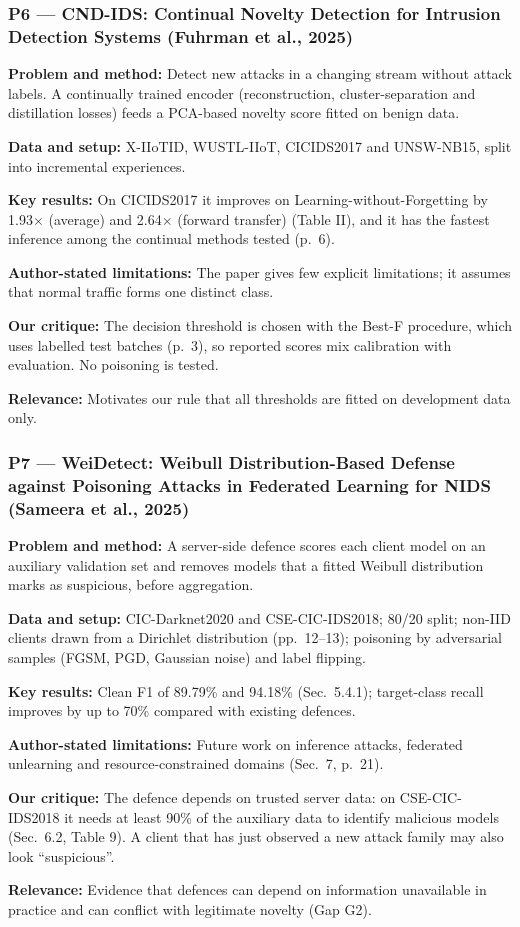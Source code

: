 \documentclass[10pt,a4paper]{article}
\newcommand{\sumitem}[2]{\noindent\textbf{#1:} #2\par}
\begin{document}
\subsubsection*{P6 --- CND-IDS: Continual Novelty Detection for Intrusion Detection Systems (Fuhrman et al., 2025)}
\sumitem{Problem and method}{Detect new attacks in a changing stream without attack labels. A continually trained encoder (reconstruction, cluster-separation and distillation losses) feeds a PCA-based novelty score fitted on benign data.}
\sumitem{Data and setup}{X-IIoTID, WUSTL-IIoT, CICIDS2017 and UNSW-NB15, split into incremental experiences.}
\sumitem{Key results}{On CICIDS2017 it improves on Learning-without-Forgetting by 1.93$\times$ (average) and 2.64$\times$ (forward transfer) (Table II), and it has the fastest inference among the continual methods tested (p.~6).}
\sumitem{Author-stated limitations}{The paper gives few explicit limitations; it assumes that normal traffic forms one distinct class.}
\sumitem{Our critique}{The decision threshold is chosen with the Best-F procedure, which uses labelled test batches (p.~3), so reported scores mix calibration with evaluation. No poisoning is tested.}
\sumitem{Relevance}{Motivates our rule that all thresholds are fitted on development data only.}

\subsubsection*{P7 --- WeiDetect: Weibull Distribution-Based Defense against Poisoning Attacks in Federated Learning for NIDS (Sameera et al., 2025)}
\sumitem{Problem and method}{A server-side defence scores each client model on an auxiliary validation set and removes models that a fitted Weibull distribution marks as suspicious, before aggregation.}
\sumitem{Data and setup}{CIC-Darknet2020 and CSE-CIC-IDS2018; 80/20 split; non-IID clients drawn from a Dirichlet distribution (pp.~12--13); poisoning by adversarial samples (FGSM, PGD, Gaussian noise) and label flipping.}
\sumitem{Key results}{Clean F1 of 89.79\% and 94.18\% (Sec.~5.4.1); target-class recall improves by up to 70\% compared with existing defences.}
\sumitem{Author-stated limitations}{Future work on inference attacks, federated unlearning and resource-constrained domains (Sec.~7, p.~21).}
\sumitem{Our critique}{The defence depends on trusted server data: on CSE-CIC-IDS2018 it needs at least 90\% of the auxiliary data to identify malicious models (Sec.~6.2, Table 9). A client that has just observed a new attack family may also look \enquote{suspicious}.}
\sumitem{Relevance}{Evidence that defences can depend on information unavailable in practice and can conflict with legitimate novelty (Gap G2).}
\end{document}

